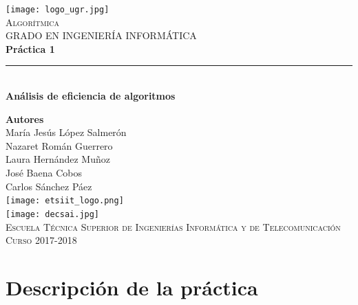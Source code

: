 \documentclass[12pt,spanish]{article}
\begin{document}
\begin{titlepage}

\newlength{\centeroffset}
\setlength{\centeroffset}{-0.5\oddsidemargin}
\addtolength{\centeroffset}{0.5\evensidemargin}
\thispagestyle{empty}

\noindent\hspace*{\centeroffset}
\begin{minipage}{\textwidth}

\centering
\texttt{[image: logo\_ugr.jpg]}\\[1.4cm]

\textsc{ \Large Algorítmica\\[0.2cm]}
\textsc{GRADO EN INGENIERÍA INFORMÁTICA}\\[1cm]

{\Huge\bfseries Práctica 1\\}
\noindent\rule[-1ex]{\textwidth}{3pt}\\[3.5ex]
{\large\bfseries Análisis de eficiencia de algoritmos}
\end{minipage}

\vspace{1.5cm}
\noindent\hspace*{\centeroffset}
\begin{minipage}{\textwidth}
\centering

\textbf{Autores}\\ {María Jesús López Salmerón \\ Nazaret Román Guerrero \\ Laura Hernández Muñoz \\ José Baena Cobos  \\ Carlos Sánchez Páez}\\[2.5ex]
\texttt{[image: etsiit\_logo.png]}\\[0.1cm]
\vspace{1.5cm}
\texttt{[image: decsai.jpg]}\\[0.1cm]
\vspace{1cm}
\textsc{Escuela Técnica Superior de Ingenierías Informática y de Telecomunicación}\\
\vspace{1cm}
\textsc{Curso 2017-2018}
\end{minipage}
\end{titlepage}
\tableofcontents
\thispagestyle{empty}
\listoftables
\listoffigures
\newpage
\setcounter{page}{1}
\section{Descripción de la práctica}
\end{document}
